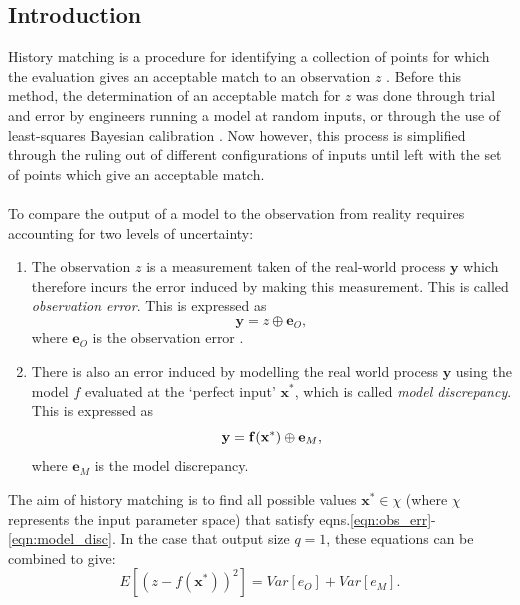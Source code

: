 \documentclass{article}
\newcommand{\numOutputs}{q}
\newcommand{\simulator}{f}
\newcommand{\inputVec}{\mathbf{x}}
\newcommand{\outputVec}{\mathbf{y}}
\newcommand{\obs}{z}
\newcommand{\obsError}{e_O}
\newcommand{\obsErrorqD}{\mathbf{e}_O}
\newcommand{\modelDisc}{e_M}
\newcommand{\modelDiscqD}{\mathbf{e}_M}
\newcommand{\paramSpace}{\chi}
\begin{document}
\subsection{Introduction}
History matching is a procedure for identifying a collection of points for which the evaluation gives an acceptable match to an observation $\obs$ \citep{Vernon2010}. Before this method, the determination of an acceptable match for $\obs$ was done through trial and error by engineers running a model at random inputs, or through the use of least-squares Bayesian calibration \citep{Craig1996}. Now however, this process is simplified through the ruling out of different configurations of inputs until left with the set of points which give an acceptable match.\\\\
To compare the output of a model to the observation from reality requires accounting for two levels of uncertainty: 
\begin{enumerate}
    \item The observation $\obs$ is a measurement taken of the real-world process $\outputVec$ which therefore incurs the error induced by making this measurement. This is called {\it observation error}. This is expressed as
    \begin{equation}
        \label{eqn:obs_err}
        \outputVec = {\obs} \oplus \obsErrorqD,
    \end{equation}
    where $\obsErrorqD$ is the observation error \citep{Bower2010}.

    \item There is also an error induced by modelling the real world process $\outputVec$ using the model $\simulator$ evaluated at the `perfect input' $\inputVec^*$, which is called {\it model discrepancy}. This is expressed as
    \begin{equation}
        \label{eqn:model_disc}
        {\bf \outputVec = \simulator(\inputVec^*)} \oplus \modelDiscqD,
    \end{equation}
    where $\modelDiscqD$ is the model discrepancy.
\end{enumerate}
The aim of history matching is to find all possible values $\inputVec^* \in \paramSpace$ (where $\paramSpace$ represents the input parameter space) that satisfy eqns.\eqref{eqn:obs_err}-\eqref{eqn:model_disc}. In the case that output size $\numOutputs=1$, these equations can be combined to give:
\begin{equation}
    \label{eqn:impl-true}
    E\left[(\obs - \simulator(\inputVec^*))^2 \right] = Var[\obsError] + Var[\modelDisc].
\end{equation}
\end{document}
